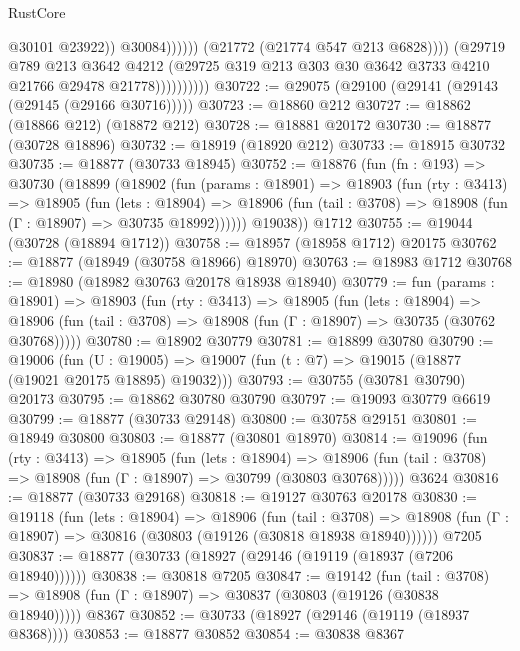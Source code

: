 \begin{lexlean}{RustCore}
\begin{coremodule}
                                        @30101
                                        @23922))
                                    @30084))))))
                        (@21772 (@21774 @547 @213 @6828))))
                    (@29719
                      @789
                      @213
                      @3642
                      @4212
                      (@29725 @319 @213 @303 @30 @3642 @3733 @4210 @21766 @29478 @21778))))))))))
@30722 := @29075 (@29100 (@29141 (@29143 (@29145 (@29166 @30716)))))
@30723 := @18860 @212
@30727 := @18862 (@18866 @212) (@18872 @212)
@30728 := @18881 @20172
@30730 := @18877 (@30728 @18896)
@30732 := @18919 (@18920 @212)
@30733 := @18915 @30732
@30735 := @18877 (@30733 @18945)
@30752 := @18876
    (fun (fn : @193) =>
    @30730
      (@18899
        (@18902
          (fun (params : @18901) =>
          @18903
            (fun (rty : @3413) =>
            @18905
              (fun (lets : @18904) =>
              @18906 (fun (tail : @3708) => @18908 (fun (Γ : @18907) => @30735 @18992))))))
        @19038))
    @1712
@30755 := @19044 (@30728 (@18894 @1712))
@30758 := @18957 (@18958 @1712) @20175
@30762 := @18877 (@18949 (@30758 @18966) @18970)
@30763 := @18983 @1712
@30768 := @18980 (@18982 @30763 @20178 @18938 @18940)
@30779 := fun (params : @18901) =>
  @18903
    (fun (rty : @3413) =>
    @18905
      (fun (lets : @18904) =>
      @18906 (fun (tail : @3708) => @18908 (fun (Γ : @18907) => @30735 (@30762 @30768)))))
@30780 := @18902 @30779
@30781 := @18899 @30780
@30790 := @19006
    (fun (U : @19005) => @19007 (fun (t : @7) => @19015 (@18877 (@19021 @20175 @18895) @19032)))
@30793 := @30755 (@30781 @30790) @20173
@30795 := @18862 @30780 @30790
@30797 := @19093 @30779 @6619
@30799 := @18877 (@30733 @29148)
@30800 := @30758 @29151
@30801 := @18949 @30800
@30803 := @18877 (@30801 @18970)
@30814 := @19096
    (fun (rty : @3413) =>
    @18905
      (fun (lets : @18904) =>
      @18906 (fun (tail : @3708) => @18908 (fun (Γ : @18907) => @30799 (@30803 @30768)))))
    @3624
@30816 := @18877 (@30733 @29168)
@30818 := @19127 @30763 @20178
@30830 := @19118
    (fun (lets : @18904) =>
    @18906
      (fun (tail : @3708) =>
      @18908 (fun (Γ : @18907) => @30816 (@30803 (@19126 (@30818 @18938 @18940))))))
    @7205
@30837 := @18877 (@30733 (@18927 (@29146 (@19119 (@18937 (@7206 @18940))))))
@30838 := @30818 @7205
@30847 := @19142
    (fun (tail : @3708) => @18908 (fun (Γ : @18907) => @30837 (@30803 (@19126 (@30838 @18940)))))
    @8367
@30852 := @30733 (@18927 (@29146 (@19119 (@18937 @8368))))
@30853 := @18877 @30852
@30854 := @30838 @8367

\end{coremodule}
\end{lexlean}
